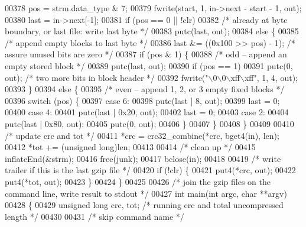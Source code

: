 \begin{DoxyCode}
{00378     pos = strm.data\_type & 7;
00379     fwrite(start, 1, in->next - start - 1, out);
00380     last = in->next[-1];
00381     \textcolor{keywordflow}{if} (pos == 0 || !clr)
00382         \textcolor{comment}{/* already at byte boundary, or last file: write last byte */}
00383         putc(last, out);
00384     \textcolor{keywordflow}{else} \{
00385         \textcolor{comment}{/* append empty blocks to last byte */}
00386         last &= ((0x100 >> pos) - 1);       \textcolor{comment}{/* assure unused bits are zero */}
00387         \textcolor{keywordflow}{if} (pos & 1) \{
00388             \textcolor{comment}{/* odd -- append an empty stored block */}
00389             putc(last, out);
00390             \textcolor{keywordflow}{if} (pos == 1)
00391                 putc(0, out);               \textcolor{comment}{/* two more bits in block header */}
00392             fwrite(\textcolor{stringliteral}{"\(\backslash\)0\(\backslash\)0\(\backslash\)xff\(\backslash\)xff"}, 1, 4, out);
00393         \}
00394         \textcolor{keywordflow}{else} \{
00395             \textcolor{comment}{/* even -- append 1, 2, or 3 empty fixed blocks */}
00396             \textcolor{keywordflow}{switch} (pos) \{
00397             \textcolor{keywordflow}{case} 6:
00398                 putc(last | 8, out);
00399                 last = 0;
00400             \textcolor{keywordflow}{case} 4:
00401                 putc(last | 0x20, out);
00402                 last = 0;
00403             \textcolor{keywordflow}{case} 2:
00404                 putc(last | 0x80, out);
00405                 putc(0, out);
00406             \}
00407         \}
00408     \}
00409 
00410     \textcolor{comment}{/* update crc and tot */}
00411     *crc = crc32\_combine(*crc, bget4(in), len);
00412     *tot += (\textcolor{keywordtype}{unsigned} long)len;
00413 
00414     \textcolor{comment}{/* clean up */}
00415     inflateEnd(&strm);
00416     free(junk);
00417     bclose(in);
00418 
00419     \textcolor{comment}{/* write trailer if this is the last gzip file */}
00420     \textcolor{keywordflow}{if} (!clr) \{
00421         put4(*crc, out);
00422         put4(*tot, out);
00423     \}
00424 \}
00425 
00426 \textcolor{comment}{/* join the gzip files on the command line, write result to stdout */}
00427 \textcolor{keywordtype}{int} main(\textcolor{keywordtype}{int} argc, \textcolor{keywordtype}{char} **argv)
00428 \{
00429     \textcolor{keywordtype}{unsigned} \textcolor{keywordtype}{long} crc, tot;     \textcolor{comment}{/* running crc and total uncompressed length */}
00430 
00431     \textcolor{comment}{/* skip command name */}
}
\end{DoxyCode}
